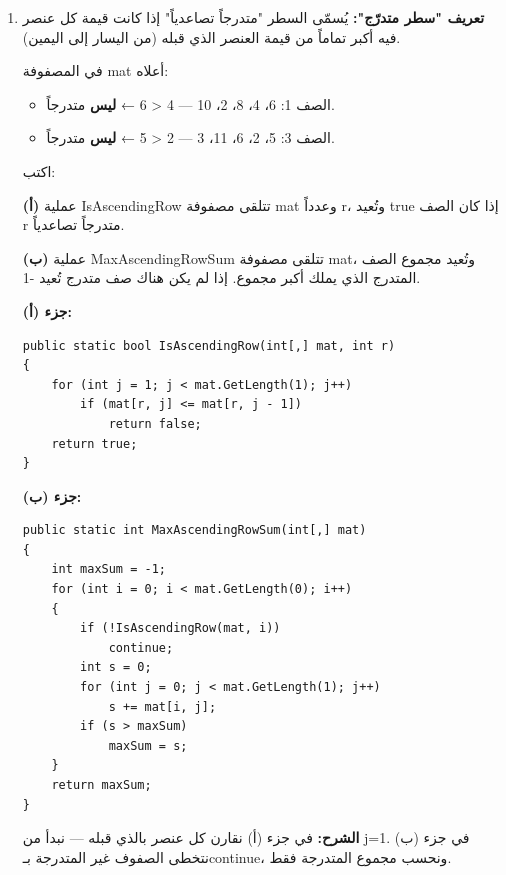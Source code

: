 \documentclass[14pt]{extarticle}
\begin{document}
\begin{enumerate}[itemsep=2em]
\clearpage
\item
\textbf{تعريف "سطر متدرّج":} يُسمّى السطر "متدرجاً تصاعدياً" إذا كانت قيمة كل عنصر فيه أكبر تماماً من قيمة العنصر الذي قبله (من اليسار إلى اليمين).

\begin{boxExample}
في المصفوفة \textenglish{mat} أعلاه:
\begin{itemize}[itemsep=1pt]
    \item الصف 1: \textenglish{6، 4، 8، 2، 10} — \textenglish{4 < 6} ← \textbf{ليس} متدرجاً.
    \item الصف 3: \textenglish{5، 2، 6، 11، 3} — \textenglish{2 < 5} ← \textbf{ليس} متدرجاً.
\end{itemize}
\end{boxExample}

اكتب:

\textbf{(أ)} عملية \textenglish{IsAscendingRow} تتلقى مصفوفة \textenglish{mat} وعدداً \textenglish{r}، وتُعيد \textenglish{true} إذا كان الصف \textenglish{r} متدرجاً تصاعدياً.

\textbf{(ب)} عملية \textenglish{MaxAscendingRowSum} تتلقى مصفوفة \textenglish{mat}، وتُعيد مجموع الصف المتدرج الذي يملك أكبر مجموع. إذا لم يكن هناك صف متدرج تُعيد \textenglish{-1}.

\ifwithsols
\begin{boxSolution}
\textbf{جزء (أ):}
\begin{boxCode}
\begin{english}
\begin{verbatim}
public static bool IsAscendingRow(int[,] mat, int r)
{
    for (int j = 1; j < mat.GetLength(1); j++)
        if (mat[r, j] <= mat[r, j - 1])
            return false;
    return true;
}
\end{verbatim}
\end{english}
\end{boxCode}

\textbf{جزء (ب):}
\begin{boxCode}
\begin{english}
\begin{verbatim}
public static int MaxAscendingRowSum(int[,] mat)
{
    int maxSum = -1;
    for (int i = 0; i < mat.GetLength(0); i++)
    {
        if (!IsAscendingRow(mat, i))
            continue;
        int s = 0;
        for (int j = 0; j < mat.GetLength(1); j++)
            s += mat[i, j];
        if (s > maxSum)
            maxSum = s;
    }
    return maxSum;
}
\end{verbatim}
\end{english}
\end{boxCode}
\textbf{الشرح:} في جزء (أ) نقارن كل عنصر بالذي قبله — نبدأ من \textenglish{j=1}. في جزء (ب) نتخطى الصفوف غير المتدرجة بـ\textenglish{continue}، ونحسب مجموع المتدرجة فقط.
\end{boxSolution}
\fi


\end{enumerate}
\end{document}
